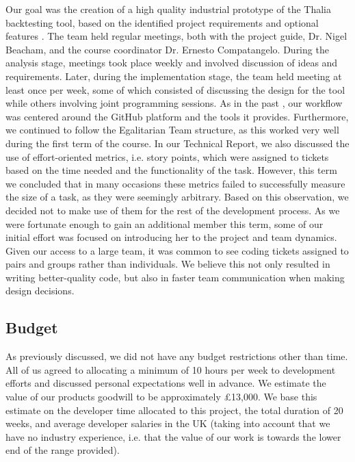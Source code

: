 \documentclass[main.tex]{subfiles}
\begin{document}
Our goal was the creation of a high quality industrial prototype of the Thalia backtesting tool, based on the identified project requirements and optional features \cite{TR}. The team held regular meetings, both with the project guide, Dr. Nigel Beacham, and the course coordinator Dr. Ernesto Compatangelo. During the analysis stage, meetings took place weekly and involved discussion of ideas and requirements. Later, during the implementation stage, the team held meeting at least once per week, some of which consisted of discussing the design for the tool while others involving joint programming sessions. \newline \newline
As in the past \cite{TR}, our workflow was centered around the GitHub platform and the tools it provides.
Furthermore, we continued to follow the Egalitarian Team structure, as this worked very well during the first term of the course.
In our Technical Report, we also discussed the use of effort-oriented metrics, i.e. story points, which were assigned to tickets based on the time needed and the functionality of the task.
However, this term we concluded that in many occasions these metrics failed to successfully measure the size of a task, as they were seemingly arbitrary. Based on this observation, we decided not to make use of them for the rest of the development process. \newline \newline
As we were fortunate enough to gain an additional member this term, some of our initial effort was focused on introducing her to the project and team dynamics. Given our access to a large team, it was common to see coding tickets assigned to pairs and groups rather than individuals. We believe this not only resulted in writing better-quality code, but also in faster team communication when making design decisions.

\subsection{Budget}
As previously discussed, we did not have any budget restrictions other than time. All of us agreed to allocating a minimum of 10 hours per week to development efforts and discussed personal expectations well in advance.  We estimate the value of our products goodwill to be approximately £13,000. We base this estimate on the developer time allocated to this project, the total duration of 20 weeks, and average developer salaries in the UK \cite{DeveloperSalary} (taking into account that we have no industry experience, i.e. that the value of our work is towards the lower end of the range provided).
\end{document}

